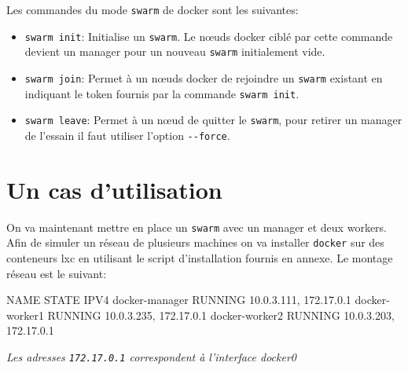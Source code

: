 Les commandes du mode \verb:swarm: de docker sont les suivantes:
\begin{itemize}
	\item \verb:swarm init:: Initialise un \verb:swarm:. Le nœuds docker ciblé par 
        cette commande devient un manager pour un nouveau \verb:swarm: initialement vide.
	\item \verb:swarm join:: Permet à un nœuds docker de rejoindre un \verb:swarm: existant
        en indiquant le token fournis par la commande \verb:swarm init:.
    \item \verb:swarm leave:: Permet à un nœud de quitter le \verb:swarm:, pour retirer un 
        manager de l'essain il faut utiliser l'option \verb:--force:.
\end{itemize}

\section{Un cas d'utilisation}

On va maintenant mettre en place un \verb:swarm: avec un manager et deux workers. Afin de
simuler un réseau de plusieurs machines on va installer \verb:docker: sur des conteneurs
lxc en utilisant le script d'installation fournis en annexe. Le montage réseau est le suivant:
\begin{bash}
NAME           STATE            IPV4        
docker-manager RUNNING 10.0.3.111, 172.17.0.1
docker-worker1 RUNNING 10.0.3.235, 172.17.0.1
docker-worker2 RUNNING 10.0.3.203, 172.17.0.1
\end{bash} 
\begin{center}
    \emph{Les adresses \verb:172.17.0.1: correspondent à l'interface docker0}
\end{center}
\jmp

